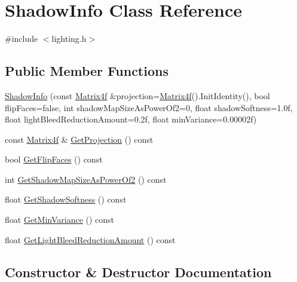 \hypertarget{class_shadow_info}{}\section{Shadow\+Info Class Reference}
\label{class_shadow_info}


{\ttfamily \#include $<$lighting.\+h$>$}

\subsection*{Public Member Functions}
\begin{DoxyCompactItemize}
\item 
\hyperlink{class_shadow_info_a1a045ae8bb80275b8f3d1b6659d866ef}{Shadow\+Info} (const \hyperlink{math3d_8h_a5b7721ab7216c91a40538beaa9e6ee1f}{Matrix4f} \&projection=\hyperlink{math3d_8h_a5b7721ab7216c91a40538beaa9e6ee1f}{Matrix4f}().Init\+Identity(), bool flip\+Faces=false, int shadow\+Map\+Size\+As\+Power\+Of2=0, float shadow\+Softness=1.\+0f, float light\+Bleed\+Reduction\+Amount=0.\+2f, float min\+Variance=0.\+00002f)
\item 
const \hyperlink{math3d_8h_a5b7721ab7216c91a40538beaa9e6ee1f}{Matrix4f} \& \hyperlink{class_shadow_info_a49808d2702d996196437f9589ba9514a}{Get\+Projection} () const 
\item 
bool \hyperlink{class_shadow_info_aa80719228d235861516931f7d35f670b}{Get\+Flip\+Faces} () const 
\item 
int \hyperlink{class_shadow_info_abea1d0fde696f23f18545a381ed4e74b}{Get\+Shadow\+Map\+Size\+As\+Power\+Of2} () const 
\item 
float \hyperlink{class_shadow_info_a6d0d788b0bc08483ba4f0ad4e40fcea1}{Get\+Shadow\+Softness} () const 
\item 
float \hyperlink{class_shadow_info_a23944aadb4f86e76626cb1644f525b97}{Get\+Min\+Variance} () const 
\item 
float \hyperlink{class_shadow_info_a1f162e2a842c8ec301847ca25a4277b7}{Get\+Light\+Bleed\+Reduction\+Amount} () const 
\end{DoxyCompactItemize}


\subsection{Constructor \& Destructor Documentation}
\hypertarget{class_shadow_info_a1a045ae8bb80275b8f3d1b6659d866ef}{}
